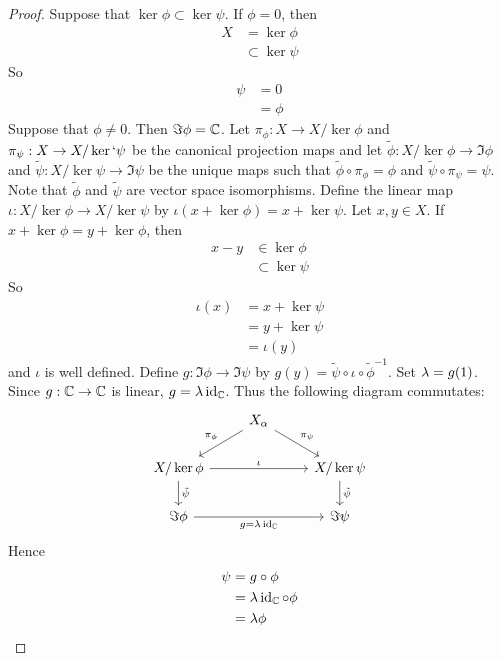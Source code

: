 \documentclass{book}
\begin{document}
	\begin{proof}
		Suppose that $\ker  \phi \subset \ker \psi$. If $\phi = 0$, then 
		\begin{align*}
			X 
			& = \ker \phi\\
			& \subset \ker \psi 
		\end{align*}
		So 
		\begin{align*}
			\psi 
			& = 0 \\
			& = \phi
		\end{align*}
		Suppose that $\phi \neq 0$. Then $\Im \phi = \mathbb{C}$. Let $\pi_{\phi}: X \rightarrow X / \ker \phi$ and $\pi_{\psi}: X \rightarrow X / \ker` \psi$ be the canonical projection maps and let $\tilde{\phi}: X / \ker \phi \rightarrow \Im \phi$ and $\tilde{\psi}:X / \ker \psi \rightarrow \Im \psi$ be the unique maps such that $\tilde{\phi} \circ \pi_{\phi} = \phi$ and $\tilde{\psi} \circ \pi_{\psi} = \psi$. Note that $\tilde{\phi}$ and $\tilde{\psi}$ are vector space isomorphisms. Define the linear map $\iota: X /\ker \phi \rightarrow X / \ker \psi$ by $\iota(x + \ker \phi) = x + \ker \psi$. Let $x,y \in X$. If $x + \ker \phi = y + \ker \phi$, then 
		\begin{align*}
			x -y 
			& \in \ker \phi \\
			& \subset \ker \psi 
		\end{align*}
		So 
		\begin{align*}
			\iota(x) 
			& = x + \ker \psi \\
			& = y + \ker \psi \\
			& = \iota(y)
		\end{align*}
		and $\iota$ is well defined. Define $g: \Im \phi \rightarrow \Im \psi$ by $g(y) = \tilde{\psi} \circ \iota \circ \tilde{\phi}^{-1}$. Set $\lambda = g(1)$. Since $g: \mathbb{C} \rightarrow \mathbb{C}$ is linear, $g = \lambda \operatorname{id}_{\mathbb{C}}$. Thus the following diagram commutates: 
		\[ 
		\begin{tikzcd}
			& X_{\al} \arrow[dr, "\pi_{\psi}"] \arrow[dl, "\pi_{\phi}"'] &  \\
			X / \ker \phi \arrow[rr, "\iota"] \arrow[d, "\tilde{\psi}"] & & X / \ker \psi  \arrow[d, "\tilde{\psi}"] \\
			\Im \phi \arrow[rr, "g = \lam \id_{\C}"'] & & \Im \psi
		\end{tikzcd}
		\]
		Hence 
		\begin{align*}
			\psi
			& = g \circ \phi \\
			& = \lambda \operatorname{id}_{\mathbb{C}} \circ \phi \\
			& = \lambda \phi
		\end{align*} 
	\end{proof}
\end{document}
